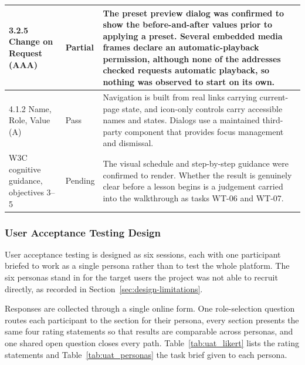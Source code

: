 \documentclass[12pt, oneside]{article} %
\newcommand{\tabbreak}{\hyphenpenalty=200\exhyphenpenalty=200\tolerance=4000\hbadness=10000\hspace{0pt}}
\begin{document}
{\begin{longtable}{|>{\raggedright\arraybackslash\tabbreak}p{2.2cm}|>{\raggedright\arraybackslash\tabbreak}p{1.5cm}|>{\raggedright\arraybackslash\tabbreak}p{9.8cm}|}
3.2.5 Change on Request (AAA) & Partial & The preset preview dialog was confirmed to show the before-and-after values prior to applying a preset. Several embedded media frames declare an automatic-playback permission, although none of the addresses checked requests automatic playback, so nothing was observed to start on its own. \\ \hline
4.1.2 Name, Role, Value (A) & Pass & Navigation is built from real links carrying current-page state, and icon-only controls carry accessible names and states. Dialogs use a maintained third-party component that provides focus management and dismissal. \\ \hline
W3C cognitive guidance, objectives 3--5 & Pending & The visual schedule and step-by-step guidance were confirmed to render. Whether the result is genuinely clear before a lesson begins is a judgement carried into the walkthrough as tasks WT-06 and WT-07. \\ \hline
\end{longtable}
}

\subsubsection{User Acceptance Testing Design}
\label{sec:uat-design}

User acceptance testing is designed as six sessions, each with one participant briefed to work as a single persona rather than to test the whole platform. The six personas stand in for the target users the project was not able to recruit directly, as recorded in Section~\ref{sec:design-limitations}.

Responses are collected through a single online form. One role-selection question routes each participant to the section for their persona, every section presents the same four rating statements so that results are comparable across personas, and one shared open question closes every path. Table~\ref{tab:uat_likert} lists the rating statements and Table~\ref{tab:uat_personas} the task brief given to each persona.
\end{document}

